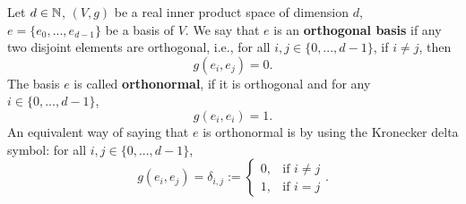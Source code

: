 \begin{definition}
  Let
    $d \in \mathbb{N}$,
    $(V, g)$ be a real inner product space of dimension $d$,
    $e = \{e_0, ..., e_{d - 1}\}$ be a basis of $V$.
  We say that $e$ is an \textbf{orthogonal basis} if any two disjoint elements
  are orthogonal, i.e., for all $i, j \in \{0, ..., d - 1\}$,
  if $i \neq j$, then
  \begin{equation}
    g(e_i, e_j) = 0.
  \end{equation}
  The basis $e$ is called \textbf{orthonormal}, if it is orthogonal and
  for any $i \in \{0, ..., d - 1\}$,
  \begin{equation}
     g(e_i, e_i) = 1.
  \end{equation}
  An equivalent way of saying that $e$ is orthonormal is by using the Kronecker
  delta symbol: for all $i, j \in \{0, ..., d - 1\}$,
  \begin{equation}
    g(e_i, e_j) = \delta_{i, j} :=
    \begin{cases}
      0, & \text{if $i \neq j$} \\
      1, & \text{if $i = j$}
    \end{cases}.
  \end{equation}
\end{definition}
